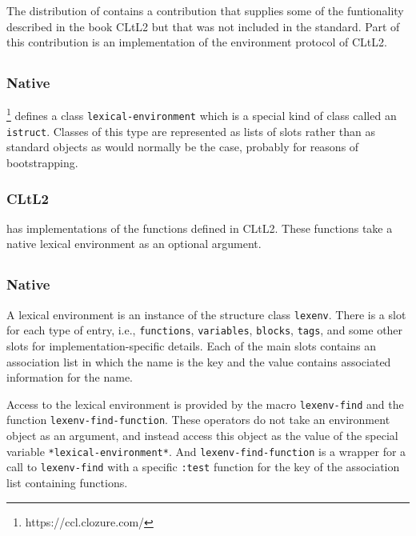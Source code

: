 The distribution of \sbcl{} contains a contribution that supplies some
of the funtionality described in the book CLtL2 but that was not
included in the \commonlisp{} standard.  Part of this contribution is
an implementation of the environment protocol of CLtL2.

\subsection{\ccl{}}

\subsubsection{Native}

\ccl{}%
\footnote{https://ccl.clozure.com/}
defines a class \texttt{lexical-environment} which is a
special kind of class called an \texttt{istruct}.  Classes of this
type are represented as lists of slots rather than as standard objects
as would normally be the case, probably for reasons of bootstrapping.

\subsubsection{CLtL2}

\ccl{} has implementations of the functions defined in CLtL2.  These
functions take a native lexical environment as an optional argument.

\subsection{\cmucl{}}

\subsubsection{Native}

A lexical environment is an instance of the structure class
\texttt{lexenv}.  There is a slot for each type of entry, i.e.,
\texttt{functions}, \texttt{variables}, \texttt{blocks},
\texttt{tags}, and some other slots for implementation-specific
details.  Each of the main slots contains an association list in which
the name is the key and the value contains associated information for
the name.

Access to the lexical environment is provided by the macro
\texttt{lexenv-find} and the function \texttt{lexenv-find-function}.
These operators do not take an environment object as an argument, and
instead access this object as the value of the special variable
\texttt{*lexical-environment*}.  And
\texttt{lexenv-find-function} is a wrapper for a call to
\texttt{lexenv-find} with a specific \texttt{:test} function for the
key of the association list containing functions.

